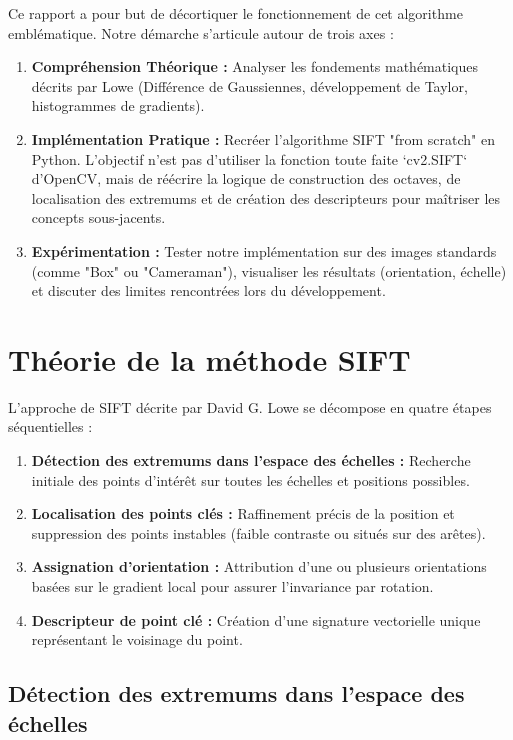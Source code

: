 \documentclass[a4paper,12pt]{report}
\begin{document}
Ce rapport a pour but de décortiquer le fonctionnement de cet algorithme emblématique. Notre démarche s'articule autour de trois axes :
\begin{enumerate}
    \item \textbf{Compréhension Théorique :} Analyser les fondements mathématiques décrits par Lowe (Différence de Gaussiennes, développement de Taylor, histogrammes de gradients).
    \item \textbf{Implémentation Pratique :} Recréer l'algorithme SIFT "from scratch" en Python. L'objectif n'est pas d'utiliser la fonction toute faite `cv2.SIFT` d'OpenCV, mais de réécrire la logique de construction des octaves, de localisation des extremums et de création des descripteurs pour maîtriser les concepts sous-jacents.
    \item \textbf{Expérimentation :} Tester notre implémentation sur des images standards (comme "Box" ou "Cameraman"), visualiser les résultats (orientation, échelle) et discuter des limites rencontrées lors du développement.
\end{enumerate}

\chapter{Théorie de la méthode SIFT}

L'approche de SIFT décrite par David G. Lowe se décompose en quatre étapes séquentielles :
\begin{enumerate}
    \item \textbf{Détection des extremums dans l'espace des échelles :} Recherche initiale des points d'intérêt sur toutes les échelles et positions possibles.
    \item \textbf{Localisation des points clés :} Raffinement précis de la position et suppression des points instables (faible contraste ou situés sur des arêtes).
    \item \textbf{Assignation d'orientation :} Attribution d'une ou plusieurs orientations basées sur le gradient local pour assurer l'invariance par rotation.
    \item \textbf{Descripteur de point clé :} Création d'une signature vectorielle unique représentant le voisinage du point.
\end{enumerate}

\section{Détection des extremums dans l'espace des échelles}
\end{document}
